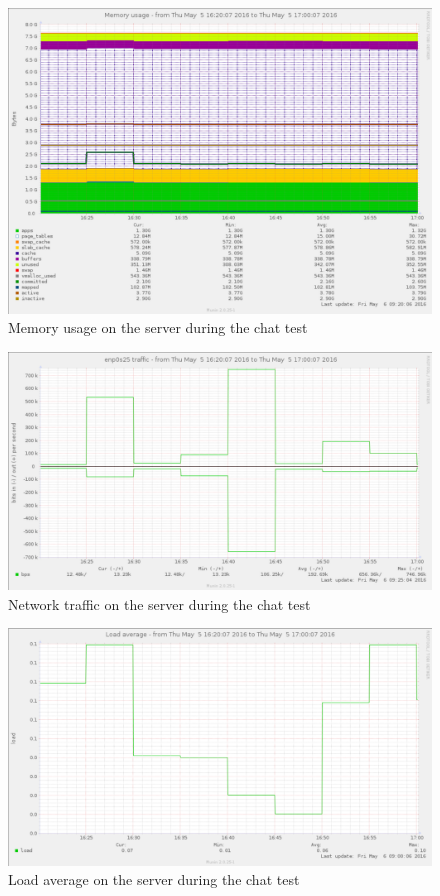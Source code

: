 \begin{figure}[H]
    \includegraphics[width=\textwidth]{figure/serversidePerformance/2016-05-05-chat-memory.png}
    \caption{Memory usage on the server during the chat test}
    \label{fig:memory-results-attachment}
\end{figure}


\begin{figure}[H]
    \includegraphics[width=\textwidth]{figure/serversidePerformance/2016-05-05-network-traffic-chat.png}
    \caption{Network traffic on the server during the chat test}
    \label{fig:network-results-attachment}
\end{figure}

\begin{figure}[H]
    \includegraphics[width=\textwidth]{figure/serversidePerformance/2016-05-05-load-average-chatting-tests.png}
    \caption{Load average on the server during the chat test}
    \label{fig:load-average-results-attachment}
\end{figure}
